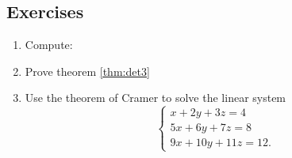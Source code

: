 \documentclass[a4paper,leqno]{article}
\numberwithin{equation}{section}
\theoremstyle{definition}
\theoremstyle{remark}
\begin{document}
\subsection*{Exercises}
\begin{enumerate}
  \item Compute:
  \item Prove theorem \ref{thm:det3}
  \item Use the theorem of Cramer to solve the linear system
        \begin{equation*}
          \begin{cases}
            x + 2y + 3z = 4\\
            5x + 6y + 7z = 8\\
            9x + 10y + 11z = 12.

\end{cases}
\end{equation*}
\end{enumerate}
\end{document}
